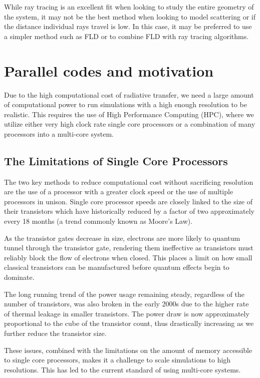 While ray tracing is an excellent fit when looking to study the entire geometry of the system, it may not be the best method when looking to model scattering or if the distance individual rays travel is low. In this case, it may be preferred to use a simpler method such as FLD or to combine FLD with ray tracing algorithms.     

\section{Parallel codes and motivation}

Due to the high computational cost of radiative transfer, we need a large amount of computational power to run simulations with a high enough resolution to be realistic. This requires the use of High Performance Computing (HPC), where we utilize either very high clock rate single core processors or a combination of many processors into a multi-core system.

\subsection{The Limitations of Single Core Processors}

The two key methods to reduce computational cost without sacrificing resolution are the use of a processor with a greater clock speed or the use of multiple processors in unison. Single core processor speeds are closely linked to the size of their transistors which have historically reduced by a factor of two approximately every 18 months (a trend commonly known as Moore's Law). 

As the transistor gates decrease in size, electrons are more likely to quantum tunnel through the transistor gate, rendering them ineffective as transistors must reliably block the flow of electrons when closed. This places a limit on how small classical transistors can be manufactured before quantum effects begin to dominate.

The long running trend of the power usage remaining steady, regardless of the number of transistors, was also broken in the early 2000s due to the higher rate of thermal leakage in smaller transistors. The power draw is now approximately proportional to the cube of the transistor count, thus drastically increasing as we further reduce the transistor size. 

These issues, combined with the limitations on the amount of memory accessible to single core processors, makes it a challenge to scale simulations to high resolutions. This has led to the current standard of using multi-core systems.

